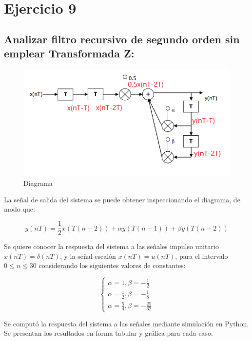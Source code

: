 \section*{Ejercicio 9}

\subsection*{Analizar filtro recursivo de segundo orden sin emplear Transformada Z:}

\begin{figure}[H]
    \centering 
    \includegraphics [scale=0.8]{images/ej9.png} 
    \caption{Diagrama}
\end{figure}

La señal de salida del sistema se puede obtener inspeccionando el diagrama, de modo que:

$$y(nT) = \frac{1}{2}x(T(n-2)) + \alpha y(T(n-1)) + \beta y(T(n-2))$$

Se quiere conocer la respuesta del sistema a las señales impulso unitario $x(nT) = \delta (nT)$, y la  señal escalón $x(nT) = u(nT)$, para el intervalo $0\leq n\leq 30$ considerando los siguientes valores de constantes:

$$
\left\{\begin{matrix}
\alpha  = 1, \beta = -\frac{1}{2} 
\\ 
\alpha  = \frac{1}{2}, \beta = -\frac{1}{8} 
\\ 
\alpha  = \frac{5}{4}, \beta = -\frac{25}{32} 
\end{matrix}\right.
$$

Se computó la respuesta del sistema a las señales mediante simulación en Python. Se presentan los resultados en forma tabular y gráfica para cada caso.

